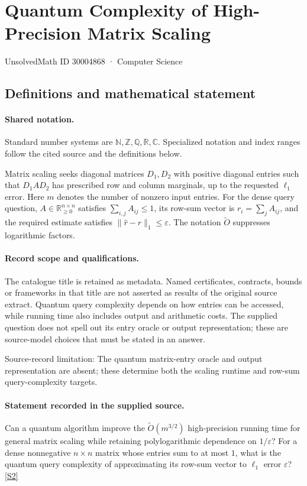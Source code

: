\documentclass[11pt]{article}
\newcommand{\sref}[2]{\hyperlink{source:#1:#2}{[S#2]}}
\begin{document}
\setcounter{section}{30004867}
\section{Quantum Complexity of High-Precision Matrix Scaling}\label{30004868}
{\small\sffamily UnsolvedMath ID 30004868 · Computer Science}
\subsection{Definitions and mathematical statement}

\paragraph{Shared notation.}Standard number systems are $\mathbb N,\mathbb Z,\mathbb Q,\mathbb R,\mathbb C$. Specialized notation and index ranges follow the cited source and the definitions below.


Matrix scaling seeks diagonal matrices $D_1,D_2$ with positive diagonal entries such that $D_1AD_2$ has prescribed row and column marginals, up to the requested $\ell_1$ error. Here $m$ denotes the number of nonzero input entries. For the dense query question, $A\in\mathbb R_{\geq0}^{n\times n}$ satisfies $\sum_{i,j}A_{ij}\leq1$, its row-sum vector is $r_i=\sum_jA_{ij}$, and the required estimate satisfies $\|\widehat r-r\|_1\leq\varepsilon$. The notation $\widetilde O$ suppresses logarithmic factors.
\paragraph{Record scope and qualifications.}
The catalogue title is retained as metadata. Named certificates, contracts, bounds or frameworks in that title are not asserted as results of the original source extract.
Quantum query complexity depends on how entries can be accessed, while running time also includes output and arithmetic costs. The supplied question does not spell out its entry oracle or output representation; these are source-model choices that must be stated in an answer.

Source-record limitation: The quantum matrix-entry oracle and output representation are absent; these determine both the scaling runtime and row-sum query-complexity targets.
\paragraph{Statement recorded in the supplied source.}
Can a quantum algorithm improve the $\widetilde O(m^{3/2})$ high-precision running time for general matrix scaling while retaining polylogarithmic dependence on $1/\varepsilon$? For a dense nonnegative $n\times n$ matrix whose entries sum to at most $1$, what is the quantum query complexity of approximating its row-sum vector to $\ell_1$ error $\varepsilon$? \sref{30004868}{2}
\end{document}

